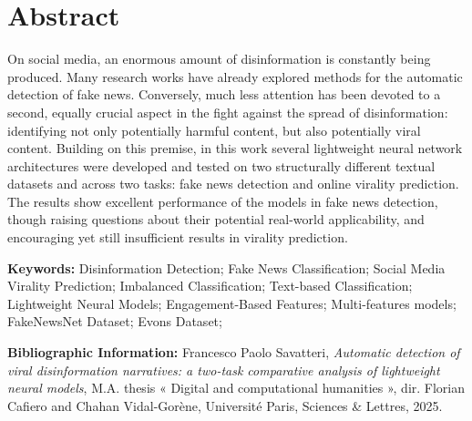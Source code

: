 \documentclass[a4paper,twoside,12pt]{book}
\begin{document}
	\thispagestyle{empty}
	
	\cleardoublepage
	
	\section*{Abstract}
	\vspace{-0.5em}
	On social media, an enormous amount of disinformation is constantly being produced. Many research works have already explored methods for the automatic detection of fake news. Conversely, much less attention has been devoted to a second, equally crucial aspect in the fight against the spread of disinformation: identifying not only potentially harmful content, but also potentially viral content. Building on this premise, in this work several lightweight neural network architectures were developed and tested on two structurally different textual datasets and across two tasks: fake news detection and online virality prediction. The results show excellent performance of the models in fake news detection, though raising questions about their potential real-world applicability, and encouraging yet still insufficient results in virality prediction.
	
	\medskip
	
	\textbf{Keywords:} Disinformation Detection; Fake News Classification; Social Media Virality Prediction; Imbalanced Classification; Text-based Classification; Lightweight Neural Models; Engagement-Based Features; Multi-features models; FakeNewsNet Dataset; Evons Dataset;
	
	\textbf{Bibliographic Information:} Francesco Paolo Savatteri, \textit{Automatic detection of viral disinformation narratives: a two-task comparative analysis of lightweight neural models}, M.A. thesis « Digital and computational humanities », dir. Florian Cafiero and Chahan Vidal-Gorène, Université Paris, Sciences \& Lettres, 2025.
	
	\vspace{-1em}
	
\end{document}
